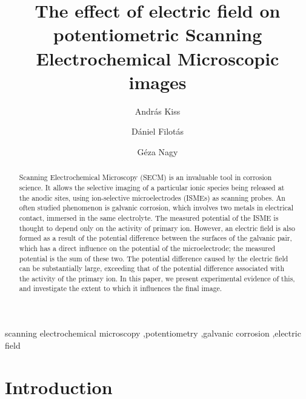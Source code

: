 \documentclass[3p]{elsarticle}
\begin{document}
\begin{frontmatter}

\title{The effect of electric field on potentiometric Scanning Electrochemical Microscopic images}
\author[akiss]{András Kiss}
\address[akiss, gnagy]{Department of General and Physical Chemistry, Faculty of Sciences, University of Pécs, 7624 Pécs, Ifjúság útja 6, Hungary}
\author[dfilotas]{Dániel Filotás}
\author[gnagy]{Géza Nagy}


\begin{abstract}

Scanning Electrochemical Microscopy (SECM) is an invaluable tool in corrosion science.
It allows the selective imaging of a particular ionic species being released at the anodic sites, using ion-selective microelectrodes (ISMEs) as scanning probes.
An often studied phenomenon is galvanic corrosion, which involves two metals in electrical contact, immersed in the same electrolyte.
The measured potential of the ISME is thought to depend only on the activity of primary ion.
However, an electric field is also formed as a result of the potential difference between the surfaces of the galvanic pair, 
which has a direct influence on the potential of the microelectrode; the measured potential is the sum of these two.
The potential difference caused by the electric field can be substantially large, exceeding that of the potential difference associated with the activity of the primary ion.
In this paper, we present experimental evidence of this, and investigate the extent to which it influences the final image. 
\end{abstract}
\begin{keyword}
	scanning electrochemical microscopy \sep potentiometry \sep galvanic corrosion \sep electric field
\end{keyword}
\end{frontmatter}

\section{Introduction}
\end{document}
